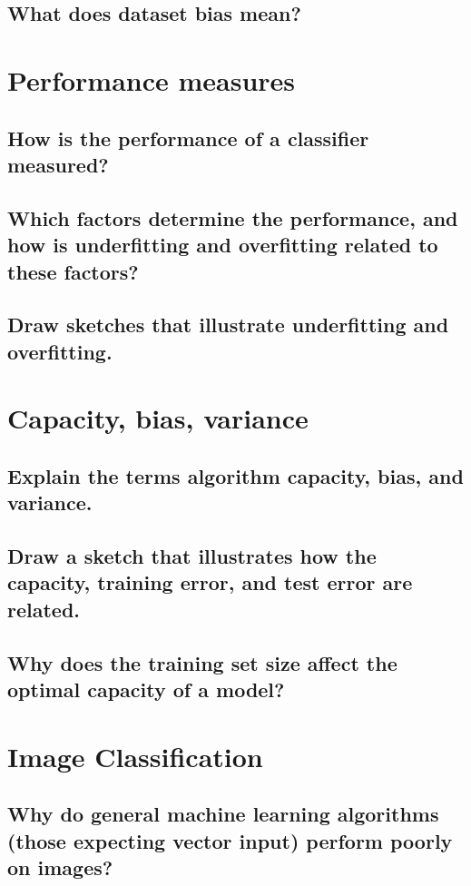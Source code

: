 \subsection{What does dataset bias mean? }

\section{Performance measures}
\subsection{How is the performance of a classifier measured?}
\subsection{Which factors determine the performance, and how is underfitting and overfitting related to these factors?}
\subsection{Draw sketches that illustrate underfitting and overfitting.}

\section{Capacity, bias, variance}
\subsection{Explain the terms algorithm capacity, bias, and variance.}
\subsection{Draw a sketch that illustrates how the capacity, training error, and test error are related.}
\subsection{Why does the training set size affect the optimal capacity of a model?}

\section{Image Classification}
\subsection{Why do general machine learning algorithms (those expecting vector input) perform poorly on images?}
